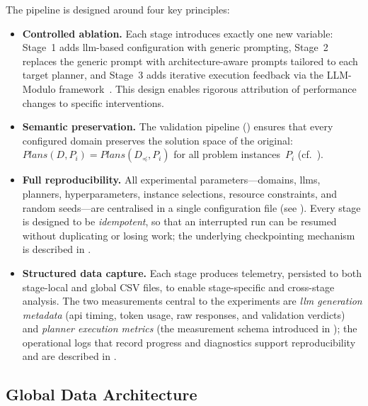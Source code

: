 The pipeline is designed around four key principles:

\begin{itemize}
  \item \textbf{Controlled ablation.}
        Each stage introduces exactly one new variable: Stage~1 adds \gls{llm}-based configuration with generic prompting, Stage~2 replaces the generic prompt with architecture-aware prompts tailored to each target planner, and Stage~3 adds iterative execution feedback via the LLM-Modulo framework~\cite{Kambhampati2024}.
        This design enables rigorous attribution of performance changes to specific interventions.

  \item \textbf{Semantic preservation.}
        The validation pipeline () ensures that every configured domain preserves the solution space of the original: $\mathit{Plans}(D, P_i) = \mathit{Plans}(D_{\preceq}, P_i)$ for all problem instances~$P_i$ (cf.~).

  \item \textbf{Full reproducibility.}
        All experimental parameters---domains, \glspl{llm}, planners, hyperparameters, instance selections, resource constraints, and random seeds---are centralised in a single configuration file (see ).
        Every stage is designed to be \emph{idempotent}, so that an interrupted run can be resumed without duplicating or losing work; the underlying checkpointing mechanism is described in .

  \item \textbf{Structured data capture.}
        Each stage produces telemetry, persisted to both stage-local and global CSV files, to enable stage-specific and cross-stage analysis.
        The two measurements central to the experiments are \emph{\gls{llm} generation metadata} (\gls{api} timing, token usage, raw responses, and validation verdicts) and \emph{planner execution metrics} (the measurement schema introduced in ); the operational logs that record progress and diagnostics support reproducibility and are described in .
\end{itemize}

\subsection{Global Data Architecture}
\label{sec:design:overview:data}

